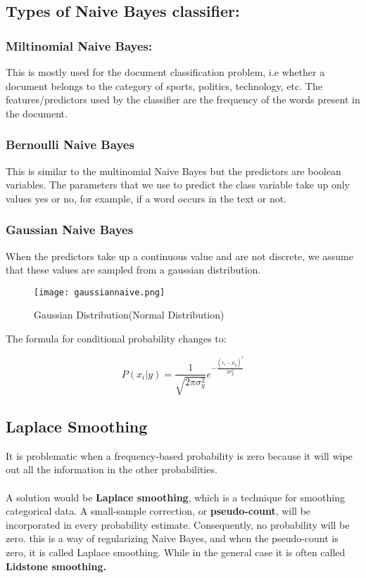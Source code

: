 \subsection{Types of Naive Bayes classifier:}
    \subsubsection{Miltinomial Naive Bayes:}
        This is mostly used for the document classification problem, i.e whether a document belongs to the category of sports, politics, technology, etc. The features/predictors used by the classifier are the frequency of the words present in the document.

    \subsubsection{Bernoulli Naive Bayes}
        This is similar to the multinomial Naive Bayes but the predictors are boolean variables. The parameters that we use to predict the class variable take up only values yes or no, for example, if a word occurs in the text or not.

    \subsubsection{Gaussian Naive Bayes}
        When the predictors take up a continuous value and are not discrete, we assume that these values are sampled from a gaussian distribution.

        \begin{figure}[h]
            \centering
            \texttt{[image: gaussiannaive.png]}
            \caption{Gaussian Distribution(Normal Distribution)}
        \end{figure}

        The formula for conditional probability changes to:

        \begin{equation}
            P(x_i|y) = \frac{1}{\sqrt{2\pi\sigma_y^2}}e^{-\frac{(x_i-\mu_y)^2}{2\sigma_y^2}}
        \end{equation}

\subsection{Laplace Smoothing}
    It is problematic when a frequency-based probability is zero because it will wipe out all the information in the other probabilities.\\ \\
    A solution would be \textbf{Laplace smoothing}, which is a technique for smoothing categorical data. A small-sample correction, or \textbf{pseudo-count}, will be incorporated in every probability estimate. Consequently, no probability will be zero. this is a way of regularizing Naive Bayes, and when the pseudo-count is zero, it is called Laplace smoothing. While in the general case it is often called \textbf{Lidstone smoothing.}

